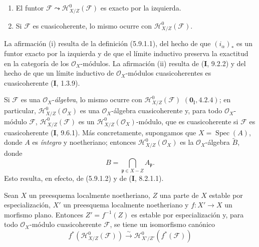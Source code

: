 \begin{proposition}[5.9.2]
\label{IV.2.s5.9.2-fr}
\begin{enumerate}
\item[\textup{(i)}] El funtor
$\mathcal F\leadsto\mathcal H^0_{X/Z}(\mathcal F)$ es exacto por la izquierda.
\item[\textup{(ii)}] Si $\mathcal F$ es cuasicoherente, lo mismo ocurre con
$\mathcal H^0_{X/Z}(\mathcal F)$.
\end{enumerate}
\end{proposition}

La afirmación (i) resulta de la definición (5.9.1.1), del hecho de que
$(i_\alpha)_*$ es un funtor exacto por la izquierda y de que el límite
inductivo preserva la exactitud en la categoría de los $\mathcal O_X$-módulos.
La afirmación (ii) resulta de (\textbf I, 9.2.2) y del hecho de que un límite inductivo
de $\mathcal O_X$-módulos cuasicoherentes es cuasicoherente (\textbf I, 1.3.9).

\begin{remark}[5.9.3]
\label{IV.2.s5.9.3-fr}
Si $\mathcal F$ es una $\mathcal O_X$-\emph{álgebra}, lo mismo ocurre con
$\mathcal H^0_{X/Z}(\mathcal F)$ $(\mathbf{0}_{\mathrm I},4.2.4)$; en particular,
$\mathcal H^0_{X/Z}(\mathcal O_X)$ es una $\mathcal O_X$-álgebra
cuasicoherente y, para todo $\mathcal O_X$-módulo $\mathcal F$,
$\mathcal H^0_{X/Z}(\mathcal F)$ es un
$\mathcal H^0_{X/Z}(\mathcal O_X)$-módulo, que es cuasicoherente si
$\mathcal F$ es cuasicoherente (\textbf I, 9.6.1). Más concretamente,
supongamos que $X=\operatorname{Spec}(A)$, donde $A$ es \emph{íntegro} y noetheriano;
entonces $\mathcal H^0_{X/Z}(\mathcal O_X)$ es la $\mathcal O_X$-álgebra
$\widetilde B$, donde
\begin{equation}
B=\bigcap_{\mathfrak p\in X-Z}A_{\mathfrak p}.
\tag{5.9.3.1}\label{IV.2.s5.9.3.1-fr}
\end{equation}
Esto resulta, en efecto, de (5.9.1.2) y de (\textbf I, 8.2.1.1).
\end{remark}

\begin{proposition}[5.9.4]
\label{IV.2.s5.9.4-fr}
Sean $X$ un preesquema localmente noetheriano, $Z$ una parte de $X$ estable
por especialización, $X'$ un preesquema localmente noetheriano y
$f:X'\to X$ un morfismo plano. Entonces $Z'=f^{-1}(Z)$ es estable por
especialización y, para todo $\mathcal O_X$-módulo cuasicoherente $\mathcal F$,
se tiene un isomorfismo canónico
\begin{equation}
f^*(\mathcal H^0_{X/Z}(\mathcal F))
\xrightarrow{\sim}\mathcal H^0_{X'/Z'}(f^*(\mathcal F))
\tag{5.9.4.1}\label{IV.2.s5.9.4.1-fr}
\end{equation}
\end{proposition}

